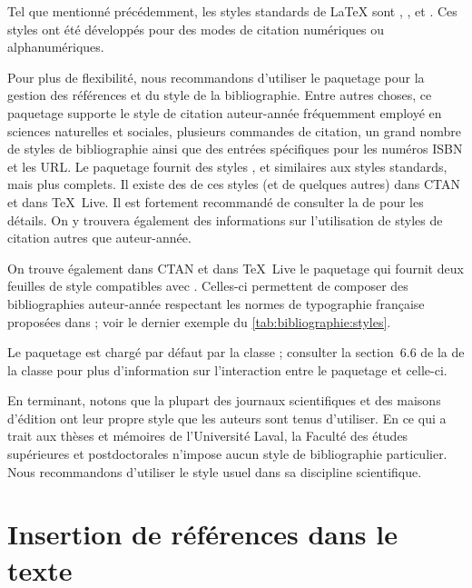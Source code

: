 Tel que mentionné précédemment, les styles standards de {\LaTeX} sont
, ,  et . Ces styles
ont été développés pour des modes de citation numériques ou
alphanumériques.

Pour plus de flexibilité, nous recommandons d'utiliser le paquetage
 pour la gestion des références et du style de la
bibliographie. Entre autres choses, ce paquetage supporte le style de
citation auteur-année fréquemment employé en sciences naturelles et
sociales, plusieurs commandes de citation, un grand nombre de styles
de bibliographie ainsi que des entrées spécifiques pour les numéros
ISBN et les URL. Le paquetage fournit des styles ,
 et  similaires aux styles standards,
mais plus complets. Il existe des %
de ces styles (et de quelques autres) dans CTAN et dans {\TeX}~Live.
Il est fortement recommandé de consulter la %
de  pour les détails. On y trouvera également des
informations sur l'utilisation de styles de citation autres que
auteur-année.

On trouve également dans CTAN et dans {\TeX}~Live le paquetage
 \citep{francais-bst} qui fournit deux feuilles de
style compatibles avec . Celles-ci permettent de composer
des bibliographies auteur-année respectant les normes de typographie
française proposées dans \citet{Malo:1996}; voir le dernier exemple
du \autoref{tab:bibliographie:styles}.

Le paquetage  est chargé par défaut par la classe
; consulter la section~6.6 de la %
de la classe pour plus d'information sur l'interaction entre le
paquetage et celle-ci.

En terminant, notons que la plupart des journaux scientifiques et des
maisons d'édition ont leur propre style que les auteurs sont tenus
d'utiliser. En ce qui a trait aux thèses et mémoires de l'Université
Laval, la Faculté des études supérieures et postdoctorales n'impose
aucun style de bibliographie particulier. Nous recommandons
d'utiliser le style usuel dans sa discipline scientifique.



\section{Insertion de références dans le texte}
\label{sec:bibliographie:cite}

